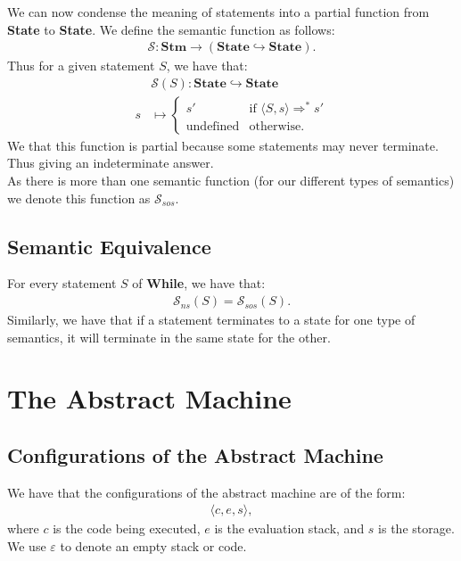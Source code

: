 \documentclass[a4paper, 12pt, twoside]{article}
\begin{document}
We can now condense the meaning of statements into a partial
function from \textbf{State} to \textbf{State}. We define the semantic
function as follows: \begin{gather*}
  \mathcal{S}: \textbf{Stm} \to (\textbf{State} \hookrightarrow \textbf{State}).
\end{gather*} Thus for a given statement $S$, we have that: \begin{align*}
  &\mathcal{S}(S) : \textbf{State} \hookrightarrow \textbf{State} \\
  s &\mapsto \begin{cases}
    s' & \text{if } \langle S, s \rangle \Rightarrow^* s' \\
    \text{undefined} & \text{otherwise}.
  \end{cases}
\end{align*} We that this function is partial because some statements
may never terminate. Thus giving an indeterminate answer.
\\[\baselineskip]
As there is more than one semantic function (for our different types
of semantics) we denote this function as $\mathcal{S}_{sos}$.

\subsection{Semantic Equivalence}

For every statement $S$ of \textbf{While}, we have that: \begin{gather*}
  \mathcal{S}_{ns}(S) = \mathcal{S}_{sos}(S).
\end{gather*} Similarly, we have that if a statement terminates to a state
for one type of semantics, it will terminate in the same state for the other.

\section{The Abstract Machine}

\subsection{Configurations of the Abstract Machine}

We have that the configurations of the abstract machine are of the 
form: \begin{gather*}
  \langle c, e, s \rangle,
\end{gather*} where $c$ is the code being executed, $e$ is the
evaluation stack, and $s$ is the storage. We use $\varepsilon$ to 
denote an empty stack or code.
\end{document}
